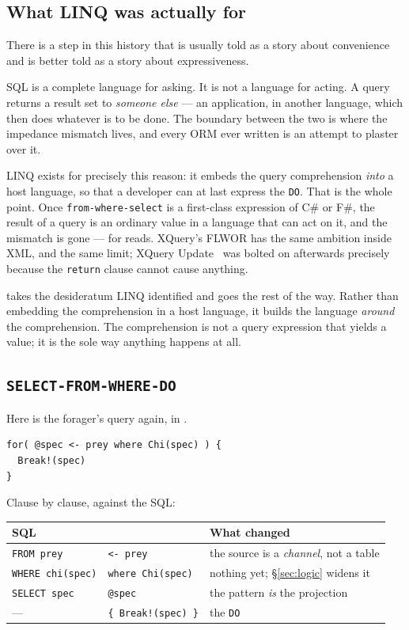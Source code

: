 \subsection{What LINQ was actually for}

There is a step in this history that is usually told as a story about
convenience and is better told as a story about expressiveness.

SQL is a complete language for asking. It is not a language for acting. A query
returns a result set to \emph{someone else} --- an application, in another
language, which then does whatever is to be done. The boundary between the two
is where the impedance mismatch lives, and every ORM ever written is an attempt
to plaster over it.

LINQ exists for precisely this reason: it embeds the query comprehension
\emph{into} a host language, so that a developer can at last express the
\texttt{DO}. That is the whole point. Once \texttt{from-where-select} is a
first-class expression of C\# or F\#, the result of a query is an ordinary value
in a language that can act on it, and the mismatch is gone --- for reads.
XQuery's FLWOR has the same ambition inside XML, and the same limit; XQuery
Update~\cite{XQueryUpdate} was bolted on afterwards precisely because the
\texttt{return} clause
cannot cause anything.

\flang{} takes the desideratum LINQ identified and goes the rest of the way.
Rather than embedding the comprehension in a host language, it builds the
language \emph{around} the comprehension. The comprehension is not a query
expression that yields a value; it is the sole way anything happens at all.

\subsection{\texttt{SELECT-FROM-WHERE-DO}}

Here is the forager's query again, in \flang{}.

\begin{lstlisting}
for( @spec <- prey where Chi(spec) ) {
  Break!(spec)
}
\end{lstlisting}

Clause by clause, against the SQL:

\begin{center}
\small
\begin{tabular}{@{}lll@{}}
\toprule
\textbf{SQL} & \textbf{\flang{}} & \textbf{What changed} \\
\midrule
\texttt{FROM prey} & \texttt{<- prey} & the source is a \emph{channel}, not a table \\
\texttt{WHERE chi(spec)} & \texttt{where Chi(spec)} & nothing yet; \S\ref{sec:logic} widens it \\
\texttt{SELECT spec} & \texttt{@spec} & the pattern \emph{is} the projection \\
--- & \texttt{\{ Break!(spec) \}} & the \texttt{DO} \\
\bottomrule
\end{tabular}
\end{center}


